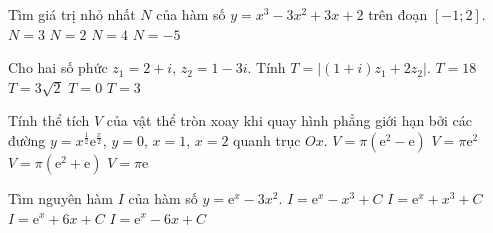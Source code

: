 \begin{ex}%
Tìm giá trị  nhỏ  nhất $N$ của hàm số  $y=x^3-3x^2+3x+2$ trên đoạn $[-1;2]$.
\choice
{\True $N = 3$}
{$N = 2$}
{$N = 4$}
{$N = -5$}
\end{ex}

\begin{ex}%
Cho hai số phức $z_1=2+i$, $z_2 = 1-3i$. Tính $T = |(1+i)z_1+2z_2|$.
\choice
{$T=18$}
{\True $T=3\sqrt{2}$}
{$T=0$}
{$T=3$}
\end{ex}

\begin{ex}%
Tính thể  tích $V$ của vật thể  tròn xoay khi quay hình phẳng giới hạn bởi các đường
$y=x^{\frac{1}{2}}\mathrm{e}^{\frac{x}{2}}$, $y=0$, $x=1$, $x=2$ quanh trục $Ox$.
\choice
{$V=\pi(\mathrm{e}^2-\mathrm{e})$}
{\True $V=\pi\mathrm{e}^2$}
{$V=\pi(\mathrm{e}^2+\mathrm{e})$}
{$V=\pi\mathrm{e}$}
\end{ex}

\begin{ex}%
Tìm nguyên hàm $I$ của hàm số $y= \mathrm{e}^x -3x^2$.
\choice
{\True $I = \mathrm{e}^x-x^3+C$}
{$I = \mathrm{e}^x+x^3+C$}
{$I = \mathrm{e}^x+6x+C$}
{$I = \mathrm{e}^x-6x+C$}
\end{ex}


